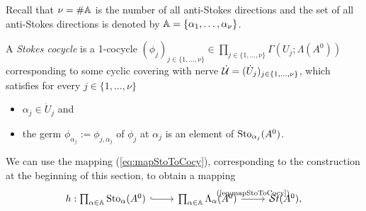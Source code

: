 Recall that $\nu=\#\mathbb{A}$ is the number of all anti-Stokes directions and the set
of all anti-Stokes directions is denoted by $\mathbb{A}=\{\alpha_1,\dots,\alpha_\nu\}$.
\begin{defn}\label{defn:stokesCocycle}
  A \emph{Stokes cocycle} is a 1-cocycle $(\phi_j)_{j\in\{1,\dots,\nu\}}\in
  \prod_{j\in\{1,\dots,\nu\}}\Gamma(U_j;\Lambda(A^0))$ corresponding to some
  cyclic covering with nerve $\dot{\mathcal{U}}=(\dot U_j)_{j\in\{1,\dots,\nu\}}$, which
  satisfies for every $j\in\{1,\dots,\nu\}$
  \begin{itemize}
  \item $\alpha_j\in\dot U_j$ and
  \item the germ $\phi_{\alpha_j}:=\phi_{j,\alpha_j}$ of $\phi_j$ at $\alpha_j$
    is an element of $\operatorname{Sto}_{\alpha_j}(A^0)$.
  \end{itemize}
  \begin{comment}
    \begin{s-rem}\label{rem:inclusionGermRemark}
      \BIGPROBLEM[refactor!remove?]  The sections
      $\Gamma(\dot U_j;\Lambda(A^0))$ are uniquely determined as the extension
      of the germ at $\alpha_j$, since the sheaf $\Lambda(A^0)$ defined via the
      system $[A^0,A^0]$ (cf.\ Definition~\ref{defn:StokesSheaf}).  We thus have
      an injective map
      \[
        \prod_{j\in\{1,\dots,\nu\}}\Gamma(\dot U_j;\Lambda(A^0))
        \hookrightarrow
        \prod_{j\in\{1,\dots,\nu\}}\Sto_{\alpha_j}(A^0) \,,
      \]
      which takes an Stokes cocycle and yields the corresponding Stokes germs.
      For a fine enough covering $\cU$, i.e.\ a covering $\cU$ with a nerve
      $\dot\cU$ which consists of small enough arcs satisfying the conditions
      above, is this map a bijection.

      We will use this fact implicitly and assume that the covering is always
      fine enough to call elements of $\prod_{\alpha\in\A}\Sto_\alpha(A^0)$
      Stokes cocycles.
    \end{s-rem}
  \end{comment}
\end{defn}
We can use the mapping (\ref{eq:mapStoToCocy}), corresponding to the construction
at the beginning of this section, to obtain a mapping
\[ \begin{tikzcd}
  h:\prod_{\alpha\in\A}\Sto_\alpha(A^0)
  \rar[hook]&
  \prod_{\alpha\in\A}\Lambda_\alpha(A^0)
  \rar{\text{(\ref{eq:mapStoToCocy})}}&
  \St(A^0),
\end{tikzcd} \]
